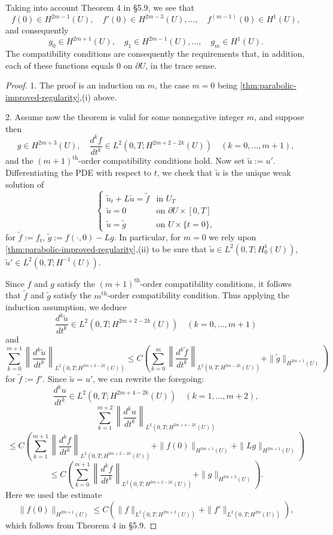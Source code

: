 \begin{remark}
\label{rem:parabolic-compatibility-conditions}
Taking into account Theorem 4 in \S5.9, we see that
\[
f(0) \in H^{2m-1}(U), \quad f'(0) \in H^{2m-3}(U), \ldots, \quad f^{(m-1)}(0) \in H^1(U),
\]
and consequently
\[
g_0 \in H^{2m+1}(U), \quad g_1 \in H^{2m-1}(U), \ldots, \quad g_m \in H^1(U).
\]
The compatibility conditions are consequently the requirements that, in addition, each of these functions equals $0$ on $\partial U$, in the trace sense.
\end{remark}

\begin{proof}
1. The proof is an induction on $m$, the case $m=0$ being \cref{thm:parabolic-improved-regularity},(i) above.

2. Assume now the theorem is valid for some nonnegative integer $m$, and suppose then
\[
g \in H^{2m+3}(U), \quad \frac{d^k f}{dt^k} \in L^2(0,T; H^{2m+2-2k}(U)) \quad (k=0,\ldots,m+1),
\tag{56}
\]
and the $(m+1)^{\text{th}}$-order compatibility conditions hold. Now set $\tilde{u} := u'$. Differentiating the PDE with respect to $t$, we check that $\tilde{u}$ is the unique weak solution of
\[
\begin{cases}
\tilde{u}_t + L\tilde{u} = \tilde{f} & \text{in } U_T \\
\tilde{u} = 0 & \text{on } \partial U \times [0,T] \\
\tilde{u} = \tilde{g} & \text{on } U \times \{t = 0\},
\end{cases}
\tag{57}
\]
for $\tilde{f} := f_t$, $\tilde{g} := f(\cdot, 0) - Lg$. In particular, for $m = 0$ we rely upon \cref{thm:parabolic-improved-regularity},(ii) to be sure that $\tilde u \in L^2(0, T; H_0^1(U))$, $\tilde u' \in L^2(0, T; H^{-1}(U))$.

Since $f$ and $g$ satisfy the $(m+1)^{\text{th}}$-order compatibility conditions, it follows that $\tilde{f}$ and $\tilde{g}$ satisfy the $m^{\text{th}}$-order compatibility condition. Thus applying the induction assumption, we deduce
\[
\frac{d^k\tilde{u}}{dt^k} \in L^2(0, T; H^{2m+2-2k}(U)) \quad (k = 0, \ldots, m+1)
\]
and
\[
\sum_{k=0}^{m+1} \left\|\frac{d^k\tilde{u}}{dt^k}\right\|_{L^2(0,T;H^{2m+2-2k}(U))} \leq C\left(\sum_{k=0}^{m} \left\|\frac{d^k\tilde{f}}{dt^k}\right\|_{L^2(0,T;H^{2m-2k}(U))} + \|\tilde{g}\|_{H^{2m+1}(U)}\right)
\]
for $\tilde{f} := f'$. Since $\tilde u = u'$, we can rewrite the foregoing:
\[
\frac{d^k u}{dt^k} \in L^2(0, T; H^{2m+4-2k}(U)) \quad (k = 1, \ldots, m+2),
\]
\[
\sum_{k=1}^{m+2} \left\|\frac{d^k u}{dt^k}\right\|_{L^2(0,T;H^{2m+4-2k}(U))}
\]
\[
\leq C\left(\sum_{k=1}^{m+1} \left\|\frac{d^k f}{dt^k}\right\|_{L^2(0,T;H^{2m+2-2k}(U))} + \|f(0)\|_{H^{2m+1}(U)} + \|Lg\|_{H^{2m+1}(U)}\right)
\]
\[
\leq C\left(\sum_{k=0}^{m+1} \left\|\frac{d^k f}{dt^k}\right\|_{L^2(0,T;H^{2m+2-2k}(U))} + \|g\|_{H^{2m+3}(U)}\right).
\tag{58}
\]
Here we used the estimate
\[
\|f(0)\|_{H^{2m+1}(U)} \leq C(\|f\|_{L^2(0,T;H^{2m+2}(U))} + \|f'\|_{L^2(0,T;H^{2m}(U))}),
\tag{59}
\]
which follows from Theorem 4 in \S5.9.


\end{proof}
